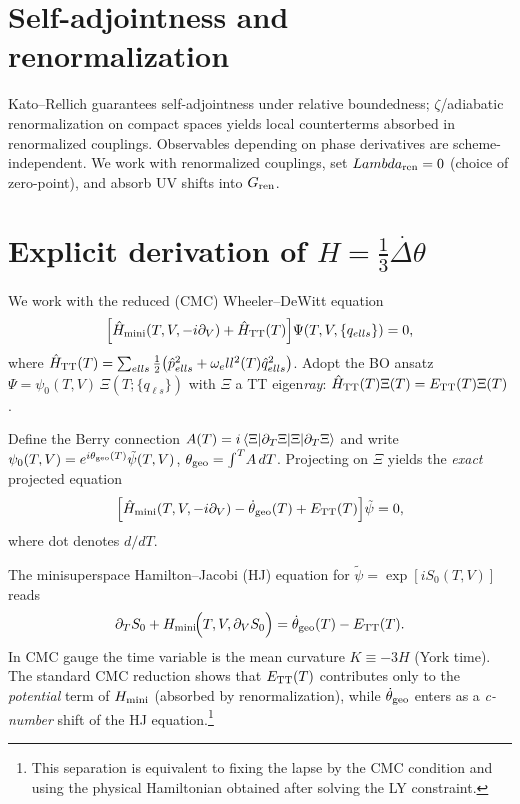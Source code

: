 \documentclass[aps,prd,twocolumn,amsmath,amssymb,nofootinbib,superscriptaddress]{revtex4-2}
\def\mathcal#1{#1}%
\def\Lambda{Lambda}%
\begin{document}
\section{Self-adjointness and renormalization}
Kato--Rellich guarantees self-adjointness under relative boundedness; $\zeta$/adiabatic renormalization on compact spaces yields local counterterms absorbed in renormalized couplings. Observables depending on phase derivatives are scheme-independent. We work with renormalized couplings, set $\Lambda_{\rm ren}=0$ (choice of zero-point), and absorb UV shifts into $G_{\rm ren}$.

\section{Explicit derivation of $H=\tfrac13\dot{\Delta\theta}$}
\label{app:explicit_phase_law}

We work with the reduced (CMC) Wheeler--DeWitt equation
\begin{equation}
\Big[\hat{\mathcal H}_{\rm mini}(T,V,-i\partial_V)+\hat H_{\rm TT}(T)\Big]\Psi(T,V,\{q_{\ell s}\})=0,
\end{equation}
where $\hat H_{\rm TT}(T)=\sum_{\ell s}\tfrac{1}{2}\big(\hat p_{\ell s}^2+\omega_\ell^2(T)\hat q_{\ell s}^2\big)$.
Adopt the BO ansatz $\Psi=\psi_0(T,V)\,\Xi(T;\{q_{\ell s}\})$ with $\Xi$ a TT eigen\emph{ray}:
$\hat H_{\rm TT}(T)\Xi(T)=E_{\rm TT}(T)\Xi(T)$.

Define the Berry connection $\mathcal A(T)=i\braket{\Xi|\partial_T \Xi}$ and write
$\psi_0(T,V)=e^{i\theta_{\rm geo}(T)}\tilde\psi(T,V)$, $\theta_{\rm geo}=\int^T\!\mathcal A\,dT$.
Projecting on $\Xi$ yields the \emph{exact} projected equation
\begin{equation}
\Big[\hat{\mathcal H}_{\rm mini}(T,V,-i\partial_V)-\dot{\theta}_{\rm geo}(T)+E_{\rm TT}(T)\Big]\tilde\psi=0,
\label{eq:projected_WDW}
\end{equation}
where dot denotes $d/dT$.

The minisuperspace Hamilton--Jacobi (HJ) equation for $\tilde\psi=\exp[iS_0(T,V)]$ reads
\begin{equation}
\partial_T S_0 + \mathcal H_{\rm mini}\!\Big(T,V,\partial_V S_0\Big)
= \dot{\theta}_{\rm geo}(T)-E_{\rm TT}(T).
\label{eq:HJ_with_phase}
\end{equation}
In CMC gauge the time variable is the mean curvature $K\equiv -3H$ (York time). The standard CMC reduction shows that $E_{\rm TT}(T)$ contributes only to the \emph{potential} term of $\mathcal H_{\rm mini}$ (absorbed by renormalization), while $\dot{\theta}_{\rm geo}$ enters as a \emph{c-number} shift of the HJ equation.\footnote{This separation is equivalent to fixing the lapse by the CMC condition and using the physical Hamiltonian obtained after solving the LY constraint.}
\end{document}
